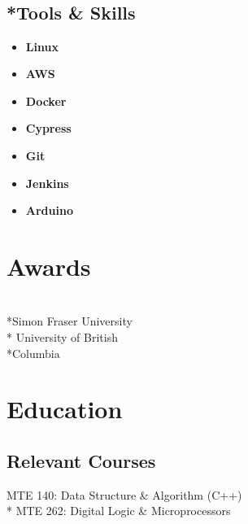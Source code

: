 \documentclass[]{morris-cv}
\begin{document}
\begin{minipage}[t]{0.25\textwidth}
\subsection{\\*Tools \& Skills}
\begin{itemize}
    \setlength\itemsep{-0.2em}
        \item \textbf{Linux}
        \item \textbf{AWS}
        \item \textbf{Docker}
        \item \textbf{Cypress}
        \item \textbf{Git}
        \item \textbf{Jenkins}
        \item \textbf{Arduino}
\end{itemize}

\section{Awards}
\\*Simon Fraser University 
\bigskip
\def\nespace{\hskip\fontdimen2\font\relax}
\\* University of British \\*Columbia


\section{Education}
\subsection{Relevant Courses}
MTE 140: Data Structure \& Algorithm (C++)
\bigskip
\\* MTE 262:  Digital Logic \& Microprocessors


\end{minipage}
\end{document}
